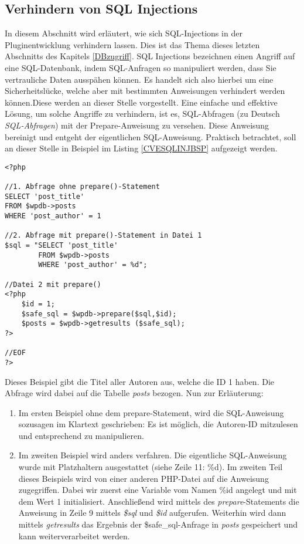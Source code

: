 \subsection{Verhindern von SQL Injections}\label{verhsqlinj}
In diesem Abschnitt wird erläutert, wie sich SQL-Injections in der Pluginentwicklung verhindern lassen. Dies ist das Thema dieses letzten Abschnitts des Kapitels \ref{DBzugriff}.\newline
SQL Injections bezeichnen einen Angriff auf eine SQL-Datenbank, indem SQL-Anfragen so manipuliert werden, dass Sie vertrauliche Daten ausspähen können. Es handelt sich also hierbei um eine Sicherheitslücke, welche aber mit bestimmten Anweisungen verhindert werden können.\newline Diese werden an dieser Stelle vorgestellt.
Eine einfache und effektive Lösung, um solche Angriffe zu verhindern, ist es, SQL-Abfragen (zu Deutsch \emph{SQL-Abfragen}) mit der Prepare-Anweisung zu versehen. Diese Anweisung bereinigt und entgeht der eigentlichen SQL-Anweisung. \newline
Praktisch betrachtet, soll an dieser Stelle in Beispiel im Listing \ref{CVESQLINJBSP} aufgezeigt werden.
\begin{lstlisting}
<?php

//1. Abfrage ohne prepare()-Statement
SELECT 'post_title'
FROM $wpdb->posts
WHERE 'post_author' = 1

//2. Abfrage mit prepare()-Statement in Datei 1
$sql = "SELECT 'post_title'
		FROM $wpdb->posts
		WHERE 'post_author' = %d";

//Datei 2 mit prepare()
<?php
	$id = 1;
	$safe_sql = $wpdb->prepare($sql,$id);
	$posts = $wpdb->getresults ($safe_sql);
?>

//EOF
?>
\end{lstlisting}
Dieses Beispiel gibt die Titel aller Autoren aus, welche die ID 1 haben. Die Abfrage wird dabei auf die Tabelle \emph{posts} bezogen.\newline
Nun zur Erläuterung: 
\begin{enumerate}
	\item Im ersten Beispiel ohne dem prepare-Statement, wird die SQL-Anweisung sozusagen im Klartext geschrieben: Es ist möglich, die Autoren-ID mitzulesen und entsprechend zu manipulieren.
	\item Im zweiten Beispiel wird anders verfahren. Die eigentliche SQL-Anweisung wurde mit Platzhaltern ausgestattet (siehe Zeile 11: \%d). \newline
	Im zweiten Teil dieses Beispiels wird von einer anderen \gls{PHP}-Datei auf die Anweisung zugegriffen. Dabei wir zuerst eine Variable vom Namen \%id angelegt und mit dem Wert 1 initialisiert. \newline
	Anschließend wird mittels des \emph{prepare}-Statements die Anweisung in Zeile 9 mittels \emph{\$sql} und \emph{\$id} aufgerufen.\newline
	Weiterhin wird dann mittels \emph{getresults} das Ergebnis der \$safe\_sql-Anfrage in \emph{posts} gespeichert und kann weiterverarbeitet werden.
\end{enumerate}
